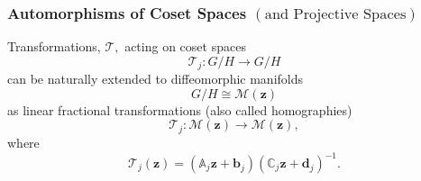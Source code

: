 \documentclass[aps,preprint]{revtex4}%
\begin{document}
\subsubsection{Automorphisms of Coset Spaces $\left(  \text{and Projective
Spaces}\right)  $}

Transformations, $\mathcal{T},$ acting on coset spaces
\begin{equation}
\mathcal{T}_{j}:G/H\rightarrow G/H
\end{equation}
can be naturally extended to diffeomorphic manifolds
\begin{equation}
G/H\cong\mathcal{M}\left(  \mathbf{z}\right)
\end{equation}
as linear fractional transformations (also called homographies)%
\begin{equation}
\mathcal{T}_{j}:\mathcal{M}\left(  \mathbf{z}\right)  \rightarrow
\mathcal{M}\left(  \mathbf{z}\right)  ,
\end{equation}
where
\begin{equation}
\mathcal{T}_{j}\left(  \mathbf{z}\right)  =\left(  \mathbb{A}_{j}%
\mathbf{z+b}_{j}\right)  \left(  \mathbb{C}_{j}\mathbf{z+d}_{j}\right)  ^{-1}.
\end{equation}
\end{document}
